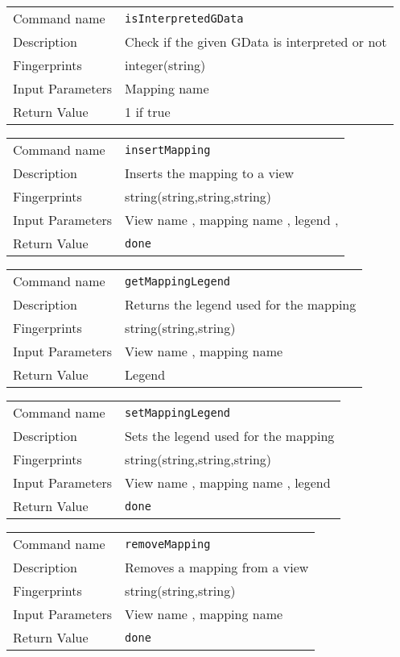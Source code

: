 \noindent
\begin{tabular}{l|p{5in}}
\hline
Command name &{\tt isInterpretedGData }\\ 
Description &
 Check if the given GData is interpreted or not 
 	\\
Fingerprints & integer(string)\\
Input Parameters& Mapping name \\
Return Value& 1 if true \\
\hline
\end{tabular}
\bigskip

\noindent
\begin{tabular}{l|p{5in}}
\hline
Command name &{\tt insertMapping }\\ 
Description &
 Inserts the mapping to a view 
 	\\
Fingerprints & string(string,string,string)\\
Input Parameters& View name , mapping name , legend , \\
Return Value&{\tt done}\\
\hline
\end{tabular}
\bigskip

\noindent
\begin{tabular}{l|p{5in}}
\hline
Command name &{\tt getMappingLegend }\\ 
Description &
 Returns the legend used for the mapping 
 	\\
Fingerprints & string(string,string)\\
Input Parameters& View name , mapping name \\
Return Value& Legend \\
\hline
\end{tabular}
\bigskip

\noindent
\begin{tabular}{l|p{5in}}
\hline
Command name &{\tt setMappingLegend }\\ 
Description &
 Sets the legend used for the mapping 
 	\\
Fingerprints & string(string,string,string)\\
Input Parameters& View name , mapping name , legend \\
Return Value&{\tt done}\\
\hline
\end{tabular}
\bigskip

\noindent
\begin{tabular}{l|p{5in}}
\hline
Command name &{\tt removeMapping }\\ 
Description &
 Removes a mapping from a view 
 	\\
Fingerprints & string(string,string)\\
Input Parameters& View name , mapping name \\
Return Value&{\tt done}\\
\hline
\end{tabular}
\bigskip

